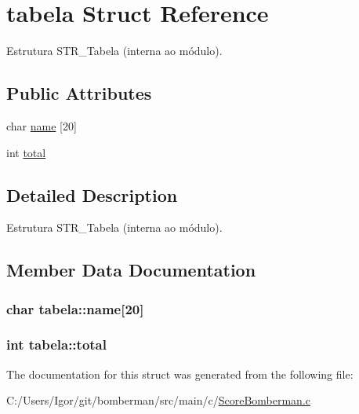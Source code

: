 \hypertarget{structtabela}{\section{tabela Struct Reference}
\label{structtabela}
}


Estrutura S\+T\+R\+\_\+\+Tabela (interna ao módulo).  


\subsection*{Public Attributes}
\begin{DoxyCompactItemize}
\item 
char \hyperlink{structtabela_a928511ba444ec09fbd0e7374ad36f63a}{name} \mbox{[}20\mbox{]}
\item 
int \hyperlink{structtabela_a73b82aedb681bf07ed6c07be3c701d37}{total}
\end{DoxyCompactItemize}


\subsection{Detailed Description}
Estrutura S\+T\+R\+\_\+\+Tabela (interna ao módulo). 



\subsection{Member Data Documentation}
\hypertarget{structtabela_a928511ba444ec09fbd0e7374ad36f63a}{
\subsubsection[{name}]{\setlength{\rightskip}{0pt plus 5cm}char tabela\+::name\mbox{[}20\mbox{]}}}\label{structtabela_a928511ba444ec09fbd0e7374ad36f63a}
\hypertarget{structtabela_a73b82aedb681bf07ed6c07be3c701d37}{
\subsubsection[{total}]{\setlength{\rightskip}{0pt plus 5cm}int tabela\+::total}}\label{structtabela_a73b82aedb681bf07ed6c07be3c701d37}


The documentation for this struct was generated from the following file\+:\begin{DoxyCompactItemize}
\item 
C\+:/\+Users/\+Igor/git/bomberman/src/main/c/\hyperlink{_score_bomberman_8c}{Score\+Bomberman.\+c}\end{DoxyCompactItemize}
